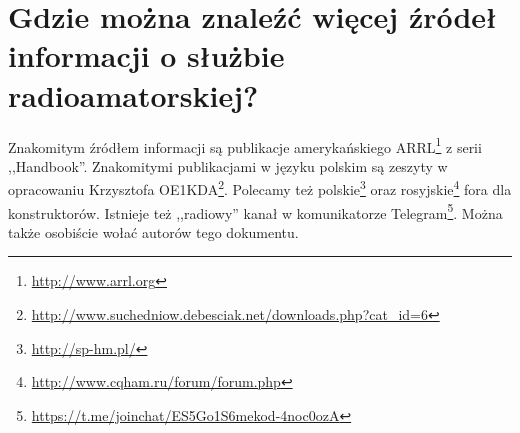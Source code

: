 \documentclass[a4paper,12pt]{article}
\begin{document}
\section{Gdzie można znaleźć więcej źródeł informacji o służbie radioamatorskiej?}
Znakomitym źródłem informacji są publikacje amerykańskiego ARRL\footnote{\url{http://www.arrl.org}} z serii ,,Handbook''. Znakomitymi publikacjami w języku polskim są zeszyty w opracowaniu Krzysztofa OE1KDA\footnote{\url{http://www.suchedniow.debesciak.net/downloads.php?cat_id=6}}. Polecamy też polskie\footnote{\url{http://sp-hm.pl/}} oraz rosyjskie\footnote{\url{http://www.cqham.ru/forum/forum.php}} fora dla konstruktorów. Istnieje też ,,radiowy'' kanał w komunikatorze Telegram\footnote{\url{https://t.me/joinchat/ES5Go1S6mekod-4noc0ozA}}. Można także osobiście wołać autorów tego dokumentu.
\end{document}
